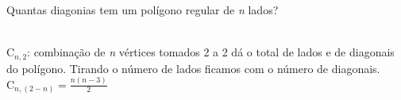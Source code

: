 \begin{ex}
 Quantas diagonias tem um polígono regular de \textit{n} lados?
   \begin{sol}
     \phantom{A}  \\
    $\mathrm{C}_{n,2} $: combinação de \textit{n} vértices tomados 2 a 2 dá o total de lados e de diagonais do polígono. Tirando o número de lados ficamos com o número de diagonais. \\
     $\mathrm{C}_{n,(2-n)}=\frac{n(n-3)}{2}$
     
     
   \end{sol}
\end{ex}